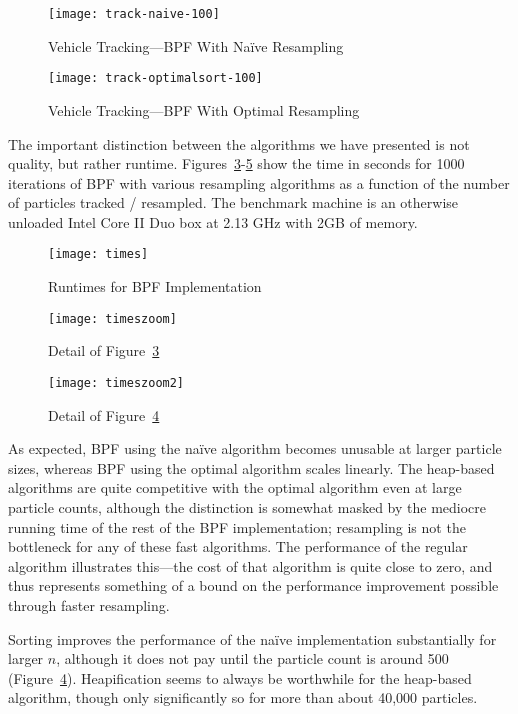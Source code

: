 \documentclass[12pt]{article}
\begin{document}
  \begin{figure}
    \centering
    \texttt{[image: track-naive-100]}
    \caption{Vehicle Tracking---BPF With Na\"ive Resampling}\label{fig-track-naive}
  \end{figure}

  \begin{figure}
    \centering
    \texttt{[image: track-optimalsort-100]}
    \caption{Vehicle Tracking---BPF With Optimal Resampling}\label{fig-track-optimal}
  \end{figure}

  The important distinction between the algorithms we have
  presented is not
  quality, but rather runtime.
  Figures~\ref{fig-times}-\ref{fig-timeszoom2} show the time
  in seconds for 1000 iterations of BPF with various
  resampling algorithms as a function of the number of
  particles tracked / resampled.  The benchmark machine is
  an otherwise unloaded Intel Core II Duo box at 2.13 GHz
  with 2GB of memory.

  \begin{figure}
    \centering
    \texttt{[image: times]}
    \caption{Runtimes for BPF Implementation}\label{fig-times}
  \end{figure}

  \begin{figure}
    \centering
    \texttt{[image: timeszoom]}
    \caption{Detail of Figure~\ref{fig-times}}\label{fig-timeszoom}
  \end{figure}

  \begin{figure}
    \centering
    \texttt{[image: timeszoom2]}
    \caption{Detail of Figure~\ref{fig-timeszoom}}\label{fig-timeszoom2}
  \end{figure}

  As expected, BPF using the na\"ive
  algorithm becomes unusable at larger particle sizes,
  whereas BPF using the optimal algorithm scales linearly.
  The heap-based algorithms are quite competitive with the
  optimal algorithm even at large particle counts, although
  the distinction is somewhat masked by the mediocre running
  time of the rest of the BPF implementation; resampling is
  not the bottleneck for any of these fast algorithms.  The
  performance of the regular algorithm illustrates
  this---the cost of that algorithm is quite close to zero,
  and thus represents something of a bound on the
  performance improvement possible through faster resampling.

  Sorting improves the performance of the na\"ive
  implementation substantially for larger $n$, although it
  does not pay until the particle count is around 500
  (Figure~\ref{fig-timeszoom}).  Heapification seems to
  always be worthwhile for the heap-based algorithm, though
  only significantly so for more than about 40,000
  particles.
\end{document}
